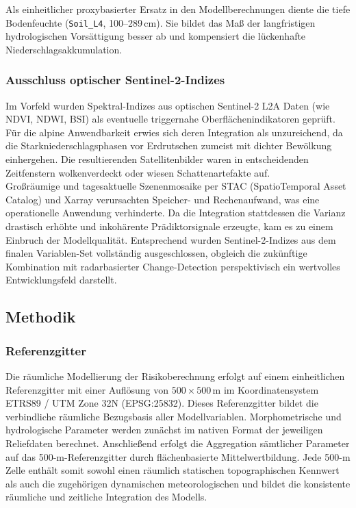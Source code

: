 \documentclass[../main.tex]{subfiles}
\begin{document}
Als einheitlicher proxybasierter Ersatz in den Modellberechnungen diente die tiefe Bodenfeuchte (\texttt{Soil\_L4}, 100--289\,cm). Sie bildet das Maß der langfristigen hydrologischen Vorsättigung besser ab und kompensiert die lückenhafte Niederschlagsakkumulation.

\subsubsection{Ausschluss optischer Sentinel-2-Indizes}
Im Vorfeld wurden Spektral-Indizes aus optischen Sentinel-2 L2A Daten (wie NDVI, NDWI, BSI) \autocite{Sentinel2L2A} als eventuelle triggernahe Oberflächenindikatoren geprüft. Für die alpine Anwendbarkeit erwies sich deren Integration als unzureichend, da die Starkniederschlagsphasen vor Erdrutschen zumeist mit dichter Bewölkung einhergehen. Die resultierenden Satellitenbilder waren in entscheidenden Zeitfenstern wolkenverdeckt oder wiesen Schattenartefakte auf. \\

Großräumige und tagesaktuelle Szenenmosaike per STAC (SpatioTemporal Asset Catalog) \autocite{STACSpatioTemporalAsset} und Xarray \autocite{XarrayNDLabeled} verursachten Speicher- und Rechenaufwand, was eine operationelle Anwendung verhinderte.
Da die Integration stattdessen die Varianz drastisch erhöhte und inkohärente Prädiktorsignale erzeugte, kam es zu einem Einbruch der Modellqualität.
Entsprechend wurden Sentinel-2-Indizes aus dem finalen Variablen-Set vollständig ausgeschlossen, obgleich die zukünftige Kombination mit radarbasierter Change-Detection perspektivisch ein wertvolles Entwicklungsfeld darstellt.

\subsection{Methodik}

\subsubsection{Referenzgitter}

Die räumliche Modellierung der Risikoberechnung erfolgt auf einem einheitlichen Referenzgitter mit einer Auflösung von $500 \times 500$\,m im Koordinatensystem ETRS89 / UTM Zone 32N (EPSG:25832).
Dieses Referenzgitter bildet die verbindliche räumliche Bezugsbasis aller Modellvariablen. Morphometrische und hydrologische Parameter werden zunächst im nativen Format der jeweiligen Reliefdaten berechnet. Anschließend erfolgt die Aggregation sämtlicher Parameter auf das 500-m-Referenzgitter durch flächenbasierte Mittelwertbildung. Jede 500-m Zelle enthält somit sowohl einen räumlich statischen topographischen Kennwert als auch die zugehörigen dynamischen meteorologischen und bildet die konsistente räumliche und zeitliche Integration des Modells.
\end{document}
